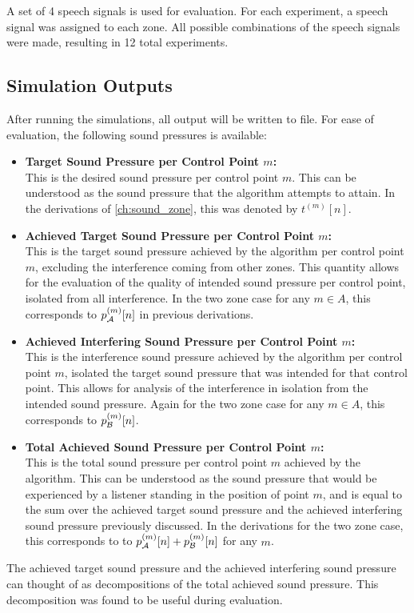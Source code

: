 A set of 4 speech signals is used for evaluation.
For each experiment, a speech signal was assigned to each zone.
All possible combinations of the speech signals were made, resulting in 12 total experiments.

\subsection{Simulation Outputs}
After running the simulations, all output will be written to file.
For ease of evaluation, the following sound pressures is available:
\begin{itemize}
    \item \textbf{Target Sound Pressure per Control Point $m$:}\\
        This is the desired sound pressure per control point $m$.
        This can be understood as the sound pressure that the algorithm attempts to attain.
        In the derivations of \autoref{ch:sound_zone}, this was denoted by $t^{(m)}[n]$.
    \item \textbf{Achieved Target Sound Pressure per Control Point $m$:}\\
        This is the target sound pressure achieved by the algorithm per control point $m$, excluding the interference coming from other zones.
        This quantity allows for the evaluation of the quality of intended sound pressure per control point, isolated from all interference.
        In the two zone case for any $m\in A$, this corresponds to $p_{\mathcal{A}}^{(m)}[n]$ in previous derivations.  
    \item \textbf{Achieved Interfering Sound Pressure per Control Point $m$:}\\
        This is the interference sound pressure achieved by the algorithm per control point $m$, isolated the target sound pressure that was intended for that control point.
        This allows for analysis of the interference in isolation from the intended sound pressure.
        Again for the two zone case for any $m\in A$, this corresponds to $p_{\mathcal{B}}^{(m)}[n]$.  
    \item \textbf{Total Achieved Sound Pressure per Control Point $m$:}\\
        This is the total sound pressure per control point $m$ achieved by the algorithm.
        This can be understood as the sound pressure that would be experienced by a listener standing in the position of point $m$, 
        and is equal to the sum over the achieved target sound pressure and the achieved interfering sound pressure previously discussed.
        In the derivations for the two zone case, this corresponds to to $p_{\mathcal{A}}^{(m)}[n] + p_{\mathcal{B}}^{(m)}[n]$ for any $m$. 
\end{itemize}
The achieved target sound pressure and the achieved interfering sound pressure can thought of as decompositions of the total achieved sound pressure.
This decomposition was found to be useful during evaluation.

